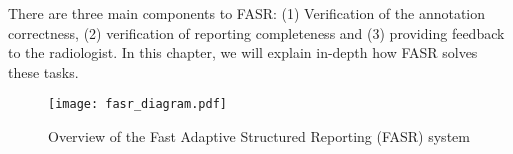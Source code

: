 There are three main components to FASR: (1) Verification of the annotation correctness, (2) verification of reporting completeness and (3) providing feedback to the radiologist. In this chapter, we will explain in-depth how FASR solves these tasks.

\begin{figure}[h]
	\centering
	\texttt{[image: fasr\_diagram.pdf]}
	\caption{Overview of the Fast Adaptive Structured Reporting (FASR) system}
	\label{fig:fasr_diagram}
\end{figure}
